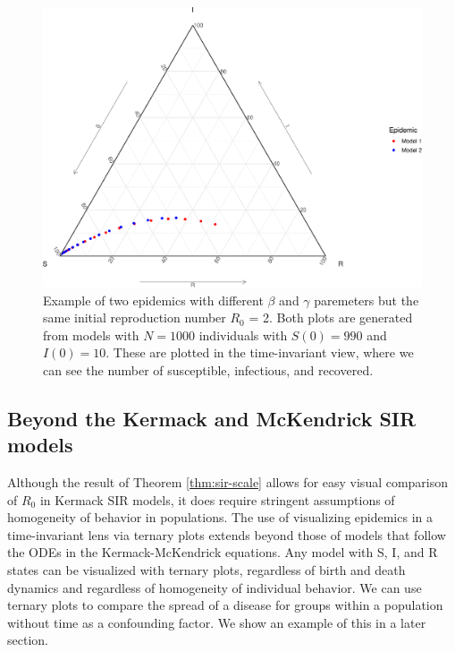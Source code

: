 \documentclass[
  shortnames]{jss}
\begin{document}
\begin{CodeChunk}
\begin{figure}[H]

{\centering \includegraphics{Figs/unnamed-chunk-3-1} 

}

\caption{\label{fig:different-scales-tern}Example of two epidemics with different $\beta$ and $\gamma$ paremeters but the same initial reproduction number $R_0$ = 2.  Both plots are generated from models with $N= 1000$ individuals with $S(0) = 990$ and $I(0) = 10$.  These are plotted in the time-invariant view, where we can see the number of susceptible, infectious, and recovered.}\label{fig:unnamed-chunk-3}
\end{figure}
\end{CodeChunk}

\hypertarget{beyond-the-kermack-and-mckendrick-sir-models}{%
\subsection{Beyond the Kermack and McKendrick SIR
models}\label{beyond-the-kermack-and-mckendrick-sir-models}}

Although the result of Theorem \ref{thm:sir-scale} allows for easy
visual comparison of \(R_0\) in Kermack SIR models, it does require
stringent assumptions of homogeneity of behavior in populations. The use
of visualizing epidemics in a time-invariant lens via ternary plots
extends beyond those of models that follow the ODEs in the
Kermack-McKendrick equations. Any model with S, I, and R states can be
visualized with ternary plots, regardless of birth and death dynamics
and regardless of homogeneity of individual behavior. We can use ternary
plots to compare the spread of a disease for groups within a population
without time as a confounding factor. We show an example of this in a
later section.
\end{document}
